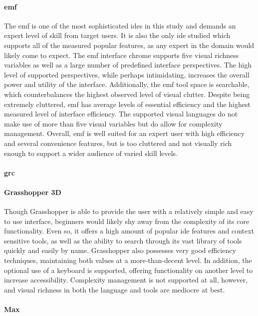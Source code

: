 \paragraph{\acl{emf}} The \ac{emf} is one of the most sophisticated
\acp{ide} in this study and demands an expert level of skill from target
users. It is also the only \ac{ide} studied which supports all of the
measured popular features, as any expert in the domain would likely come to
expect. The \ac{emf} interface chrome supports five visual richness
variables as well as a large number of predefined interface perspectives.
The high level of supported perspectives, while perhaps intimidating,
increases the overall power and utility of the interface. Additionally, the
\ac{emf} tool space is searchable, which counterbalances the highest
observed level of visual clutter. Despite being extremely cluttered,
\ac{emf} has average levels of essential efficiency and the highest
measured level of interface efficiency. The supported visual languages do
not make use of more than five visual variables but do allow for complexity
management. Overall, \ac{emf} is well suited for an expert user with high
efficiency and several convenience features, but is too cluttered and not
visually rich enough to support a wider audience of varied skill levels.

\paragraph{\acl{grc}}

\paragraph{Grasshopper 3D} Though Grasshopper is able to provide the user
with a relatively simple and easy to use interface, beginners would likely
shy away from the complexity of its core functionality. Even so, it offers
a high amount of popular \ac{ide} features and context sensitive tools, as
well as the ability to search through its vast library of tools quickly and
easily by name. Grasshopper also possesses very good efficiency techniques,
maintaining both values at a more-than-decent level. In addition, the
optional use of a keyboard is supported, offering functionality on another
level to increase accessibility. Complexity management is not supported at
all, however, and visual richness in both the language and tools are
mediocre at best.

\paragraph{Max}

